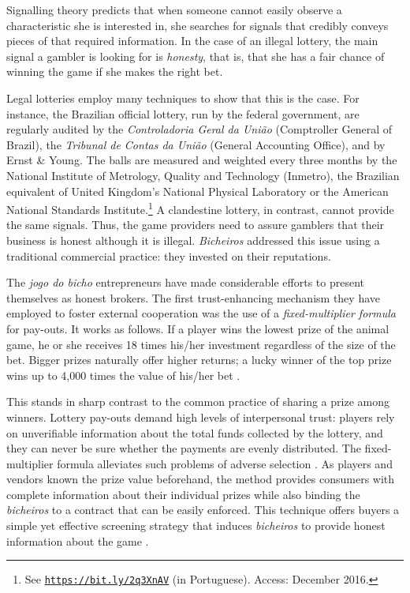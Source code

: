 \documentclass[a4paper,12pt]{article}
\begin{document}
Signalling theory predicts that when someone cannot easily observe a characteristic she is interested in, she searches for signals that credibly conveys pieces of that required information. In the case of an illegal lottery, the main signal a gambler is looking for is \textit{honesty}, that is, that she has a fair chance of winning the game if she makes the right bet. 

Legal lotteries employ many techniques to show that this is the case. For instance, the Brazilian official lottery, run by the federal government, are regularly audited by the \textit{Controladoria Geral da União} (Comptroller General of Brazil), the \textit{Tribunal de Contas da União} (General Accounting Office), and by Ernst \& Young. The balls are measured and weighted every three months by the National Institute of Metrology, Quality and Technology (Inmetro), the Brazilian equivalent of United Kingdom's National Physical Laboratory or the American National Standards Institute.\footnote{See \href{http://noticias.uol.com.br/cotidiano/ultimas-noticias/2016/04/08/auditoria-dos-sorteios-da-caixa-e-confiavel-veja-como-e-o-processo.htm}{\texttt{https://bit.ly/2q3XnAV}} (in Portuguese). Access: December 2016.} A clandestine lottery, in contrast, cannot provide the same signals. Thus, the game providers need to assure gamblers that their business is honest although it is illegal. \textit{Bicheiros} addressed this issue using a traditional commercial practice: they invested on their reputations.   

The \textit{jogo do bicho} entrepreneurs have made considerable efforts to present themselves as honest brokers. The first trust-enhancing mechanism they have employed to foster external cooperation was the use of a \textit{fixed-multiplier formula} for pay-outs. It works as follows. If a player wins the lowest prize of the animal game, he or she receives 18 times his/her investment regardless of the size of the bet. Bigger prizes naturally offer higher returns; a lucky winner of the top prize wins up to 4,000 times the value of his/her bet \citetext{\citealp[89]{labronici2012paratodos}; \citealp[20]{magalhaes2005ganhou}}.

This stands in sharp contrast to the common practice of sharing a prize among winners. Lottery pay-outs demand high levels of interpersonal trust: players rely on unverifiable information about the total funds collected by the lottery, and they can never be sure whether the payments are evenly distributed. The fixed-multiplier formula alleviates such problems of adverse selection \citep{akerlof1970market, cohen2010testing, levin2001information}. As players and vendors known the prize value beforehand, the method provides consumers with complete information about their individual prizes while also binding the \textit{bicheiros} to a contract that can be easily enforced. This technique offers buyers a simple yet effective screening strategy that induces \textit{bicheiros} to provide honest information about the game \citep{spence1973job, stiglitz1981credit}.
\end{document}
